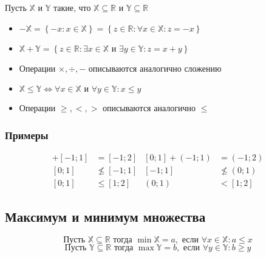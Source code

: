 \documentclass[class=article,a4paper,12pt,crop=false]{standalone}
\begin{document}
Пусть $\mathbb{X}$ и $\mathbb{Y}$ такие, что
$\mathbb{X} \subseteq \mathbb{R}$ и $\mathbb{Y} \subseteq \mathbb{R}$
    
\begin{itemize}
  \item {
    $
    -\mathbb{X} = \left\{-x: x \in \mathbb{X} \right\} =
    \left\{z \in \mathbb{R}: \forall x \in \mathbb{X}: z = -x\right\}
    $
  }
  \item {
    $
    \mathbb{X} + \mathbb{Y} = \left\{ z \in \mathbb{R}: \exists
    x \in \mathbb{X} \text{ и } \exists y \in \mathbb{Y}: z = x + y\right\}
    $
  }
  \item {
    Операции $\times, \div, -$ описываются аналогично сложению
  }
  \item {
    $
    \mathbb{X} \leq \mathbb{Y} \Leftrightarrow \forall x \in \mathbb{X}
    \text{ и } \forall y \in \mathbb{Y}: x \leq y
    $
  } \item {
    Операции $\geq, <, >$ описываются аналогично $\leq$
  }
\end{itemize}

\subsubsection{Примеры}

  \begin{align*}
    [0; 1] + [-1; 1] & = [-1; 2] & [0; 1] + (-1; 1) & = (-1; 2) \\
    [0; 1] & \nleq [-1; 1] & [-1; 1] & \nleq (0; 1) \\
    [0; 1] & \leq [1; 2] & (0; 1) & < [1; 2]
  \end{align*}

\subsection{Максимум и минимум множества}

\begin{equation}
  \text{Пусть } \mathbb{X} \subseteq \mathbb{R} \text{ тогда } \min{\mathbb{X}}
  = a, \text{ если } \forall x \in \mathbb{X}: a \leq x
\end{equation}
\begin{equation}
  \text{Пусть } \mathbb{Y} \subseteq \mathbb{R} \text{ тогда } \max{\mathbb{Y}}
  = b, \text{ если } \forall y \in \mathbb{Y}: b \geq y
\end{equation}
\end{document}
